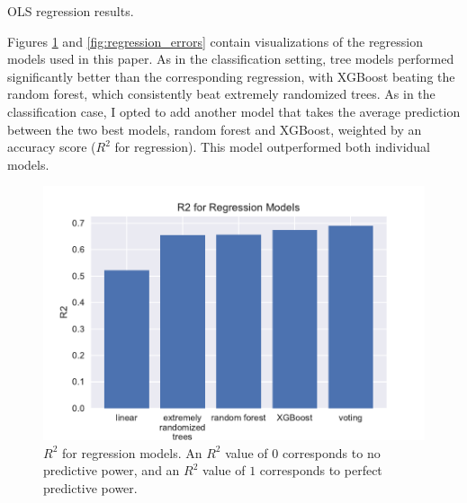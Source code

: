 \documentclass[12pt]{article}
\begin{document}
\begin{table}[!htbp]
    \footnotesize
    
    \caption{OLS regression results.}
    \label{table:linear_results}
\end{table}

Figures \ref{fig:regression_r2} and \ref{fig:regression_errors} contain visualizations of the regression models used in this paper. As in the classification setting, tree models performed significantly better than the corresponding regression, with XGBoost beating the random forest, which consistently beat extremely randomized trees. As in the classification case, I opted to add another model that takes the average prediction between the two best models, random forest and XGBoost, weighted by an accuracy score ($R^2$ for regression). This model outperformed both individual models. 

\begin{figure}[!htbp]
    \centering
    \includegraphics[width=\textwidth]{graphics/regression_r2}
    \caption{$R^2$ for regression models. An $R^2$ value of $0$ corresponds to no predictive power, and an $R^2$ value of $1$ corresponds to perfect predictive power.}
    \label{fig:regression_r2}
\end{figure}
\end{document}

